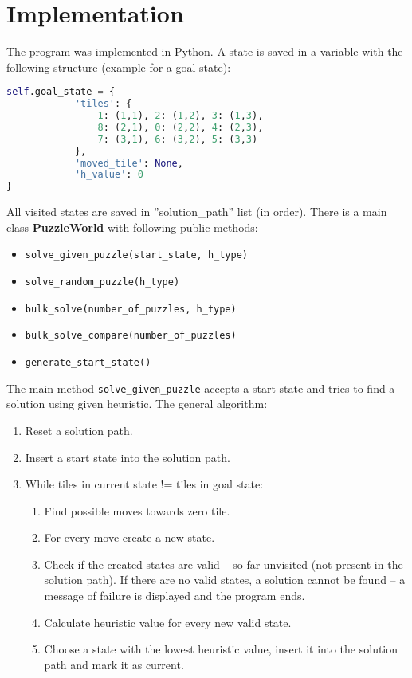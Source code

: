 \documentclass[a4paper]{article}
\begin{document}
\section{Implementation}
The program was implemented in Python. A state is saved in a variable with the following structure (example for a goal state):
\begin{lstlisting}[language=python]
self.goal_state = {
            'tiles': {
                1: (1,1), 2: (1,2), 3: (1,3),
                8: (2,1), 0: (2,2), 4: (2,3),
                7: (3,1), 6: (3,2), 5: (3,3)
            },
            'moved_tile': None,
            'h_value': 0
}
\end{lstlisting}
All visited states are saved in ''solution\_path'' list (in order). There is a main class \textbf{PuzzleWorld} with following public methods: 
\begin{itemize}
\item \verb|solve_given_puzzle(start_state, h_type)|
\item \verb|solve_random_puzzle(h_type)|
\item \verb|bulk_solve(number_of_puzzles, h_type)|
\item \verb|bulk_solve_compare(number_of_puzzles)|
\item \verb|generate_start_state()|
\end{itemize}

The main method \verb|solve_given_puzzle| accepts a start state and tries to find a solution using given heuristic. The general algorithm:
\begin{enumerate}
\item Reset a solution path.
\item Insert a start state into the solution path.
\item While tiles in current state != tiles in goal state:
	\begin{enumerate}
	\item Find possible moves towards zero tile.
           \item For every move create a new state.
           \item Check if the created states are valid -- so far unvisited (not present in the solution path). If there are no valid states, a solution cannot be found -- a message of failure is displayed and the program ends.
           \item Calculate heuristic value for every new valid state.
           \item Choose a state with the lowest heuristic value, insert it into the solution path and mark it as current.
	\end{enumerate}
\end{enumerate}
\end{document}
